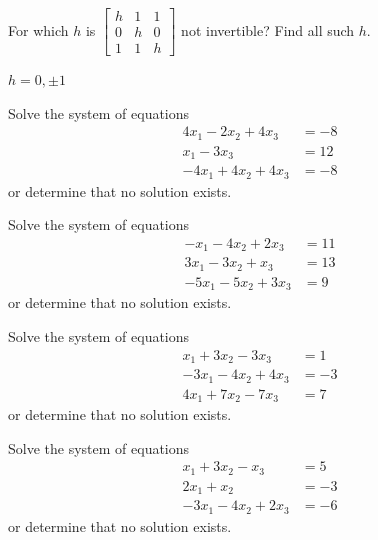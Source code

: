 \begin{exercise}
For which $h$ is
$\left[ \begin{smallmatrix}
h & 1 & 1 \\
0 & h & 0 \\
1 & 1 & h
\end{smallmatrix} \right]$
not invertible?  Find all such $h$.
\end{exercise}
\comboSol{%
}
{%
$h = 0, \pm 1$
}

\begin{exercise}\ansMark%
Solve the system of equations
\begin{equation*}
\begin{split}
 4x_1 - 2x_2 + 4x_3 &= -8 \\ 
 x_1 - 3x_3 &= 12\\
-4x_1 + 4x_2 + 4x_3 &= -8 
\end{split}
\end{equation*}
or determine that no solution exists.
\end{exercise}
%

\begin{exercise}\ansMark%
Solve the system of equations
\begin{equation*}
\begin{split}
 -x_1 - 4x_2 + 2x_3 &= 11 \\ 
 3x_1 -3x_2 + x_3 &= 13\\
-5x_1 - 5x_2 + 3x_3 &= 9 
\end{split}
\end{equation*}
or determine that no solution exists.
\end{exercise}
%

\begin{exercise}\ansMark%
Solve the system of equations
\begin{equation*}
\begin{split}
x_1 + 3x_2 - 3x_3 &= 1 \\ 
 -3x_1 - 4x_2  +4x_3 &= -3\\
4x_1 + 7x_2 - 7x_3 &= 7 
\end{split}
\end{equation*}
or determine that no solution exists.
\end{exercise}
%

\begin{exercise}\ansMark%
Solve the system of equations
\begin{equation*}
\begin{split}
 x_1  + 3x_2  - x_3 &= 5 \\ 
 2x_1 +x_2 &= -3\\
-3x_1 - 4x_2 + 2x_3 &= -6 
\end{split}
\end{equation*}
or determine that no solution exists.
\end{exercise}
%

